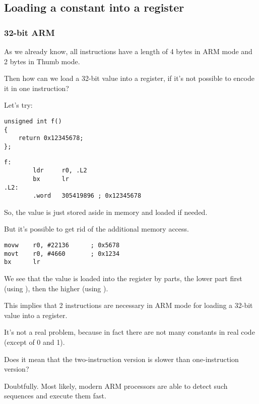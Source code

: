 ﻿\subsection{Loading a constant into a register}
\label{ARM_big_constants}

\subsubsection{32-bit ARM}
\label{ARM_big_constants_loading}

As we already know, all instructions have a length of 4 bytes in ARM mode and 2 bytes in Thumb mode.

Then how can we load a 32-bit value into a register, if it's not possible to encode it in one instruction?

Let's try:

\begin{lstlisting}
unsigned int f()
{
	return 0x12345678;
};
\end{lstlisting}

\begin{lstlisting}[caption=GCC 4.6.3 -O3 \ARMMode]
f:
        ldr     r0, .L2
        bx      lr
.L2:
        .word   305419896 ; 0x12345678
\end{lstlisting}

So, the  value is just stored aside in memory and loaded if needed.

But it's possible to get rid of the additional memory access.

\begin{lstlisting}[caption=GCC 4.6.3 -O3 -march{=}armv7-a (\ARMMode)]
movw    r0, #22136      ; 0x5678
movt    r0, #4660       ; 0x1234
bx      lr
\end{lstlisting}

We see that the value is loaded into the register by parts, the lower part first (using ), 
then the higher (using ).

This implies that 2 instructions are necessary in ARM mode for loading a 32-bit value into a register.

It's not a real problem, because in fact there are not many constants in real code (except of 0 and 1).

Does it mean that the two-instruction version is slower than one-instruction version?

Doubtfully. Most likely, modern ARM processors are able to detect such sequences and execute
them fast.

